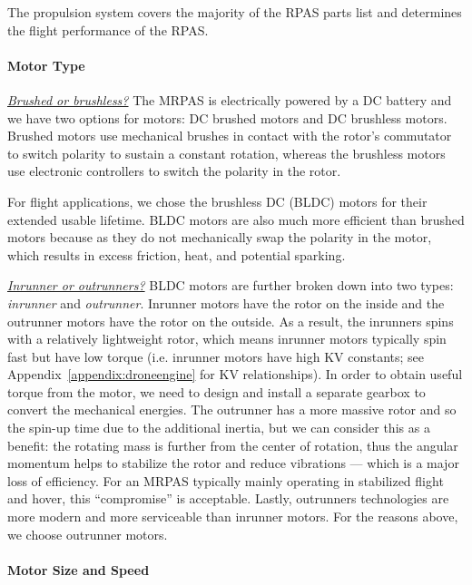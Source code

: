 The propulsion system covers the majority of the RPAS parts list and determines the flight performance of the RPAS. 

\paragraph{Motor Type}

\underline{\textit{Brushed or brushless?}}
The MRPAS is electrically powered by a DC battery and we have two options for motors: DC brushed motors and DC brushless motors. Brushed motors use mechanical brushes in contact with the rotor’s commutator to switch polarity to sustain a constant rotation, whereas the brushless motors use electronic controllers to switch the polarity in the rotor. 

For flight applications, we chose the brushless DC (BLDC) motors for their extended usable lifetime. BLDC motors are also much more efficient than brushed motors because as they do not mechanically swap the polarity in the motor, which results in excess friction, heat, and potential sparking. 

\underline{\textit{Inrunner or outrunners?}}
BLDC motors are further broken down into two types: \textit{inrunner} and \textit{outrunner}. Inrunner motors have the rotor on the inside and the outrunner motors have the rotor on the outside.  As a result, the inrunners spins with a relatively lightweight rotor, which means inrunner motors typically spin fast but have low torque (i.e. inrunner motors have high KV constants; see Appendix~\ref{appendix:droneengine} for KV relationships). In order to obtain useful torque from the motor, we need to design and install a separate gearbox to convert the mechanical energies\cite{invsoutrunner}. The outrunner has a more massive rotor and so the spin-up time due to the additional inertia, but we can consider this as a benefit: the rotating mass is further from the center of rotation, thus the angular momentum helps to stabilize the rotor and reduce vibrations --- which is a major loss of efficiency. For an MRPAS typically mainly operating in stabilized flight and hover, this ``compromise'' is acceptable. Lastly, outrunners technologies are more modern and more serviceable than inrunner motors\cite{invsoutrunner}. For the reasons above, we choose outrunner motors.

\paragraph{Motor Size and Speed}\label{section:motor-speed}

